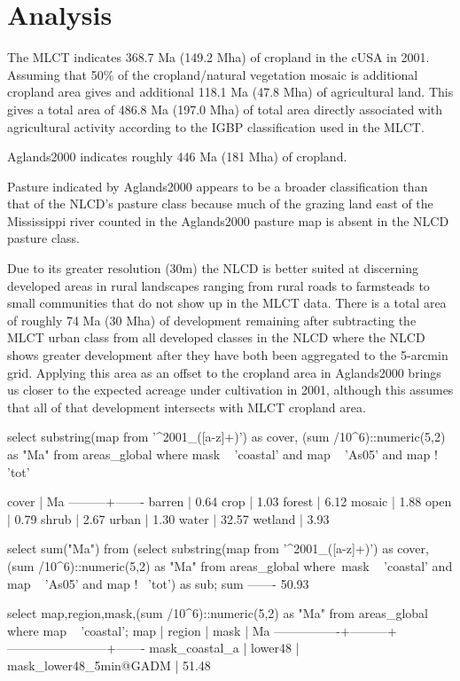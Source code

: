 
\chapter{Analysis}
\label{cha:analysis}

The MLCT indicates 368.7 Ma (149.2 Mha) of cropland in the cUSA in 2001.  Assuming that 50\% of the cropland/natural vegetation mosaic is additional cropland area gives and additional 118.1 Ma (47.8 Mha) of agricultural land.  This gives a total area of  486.8 Ma (197.0 Mha) of total area directly associated with agricultural activity according to the IGBP classification used in the MLCT.

Aglands2000 indicates roughly 446 Ma (181 Mha) of cropland.

Pasture indicated by Aglands2000 appears to be a broader classification than that of the NLCD's pasture class because much of the grazing land east of the Mississippi river counted in the Aglands2000 pasture map is absent in the NLCD pasture class.

Due to its greater resolution (30m) the NLCD is better suited at discerning developed areas in rural landscapes ranging from rural roads to farmsteads to small communities that do not show up in the MLCT data.  There is a total area of roughly 74 Ma (30 Mha) of development remaining after subtracting the MLCT urban class from all developed classes in the NLCD where the NLCD shows greater development after they have both been aggregated to the 5-arcmin grid.  Applying this area as an offset to the cropland area in Aglands2000 brings us closer to the expected acreage under cultivation in 2001, although this assumes that all of that development intersects with MLCT cropland area.




select substring(map from '^2001_([a-z]+)') as cover, (sum /10^6)::numeric(5,2) as "Ma" from areas_global where mask ~ 'coastal' and map ~ 'As05' and map !~ 'tot'

  cover  |  Ma
---------+-------
 barren  |  0.64
 crop    |  1.03
 forest  |  6.12
 mosaic  |  1.88
 open    |  0.79
 shrub   |  2.67
 urban   |  1.30
 water   | 32.57
 wetland |  3.93

select sum("Ma") from (select substring(map from '^2001_([a-z]+)') as cover, (sum /10^6)::numeric(5,2) as "Ma" from areas_global where\
 mask ~ 'coastal' and map ~ 'As05' and map !~ 'tot') as sub;
  sum
-------
 50.93


select map,region,mask,(sum /10^6)::numeric(5,2) as "Ma" from areas_global where map ~ 'coastal';
      map       | region  |          mask          |  Ma
----------------+---------+------------------------+-------
 mask_coastal_a | lower48 | mask_lower48_5min@GADM | 51.48


